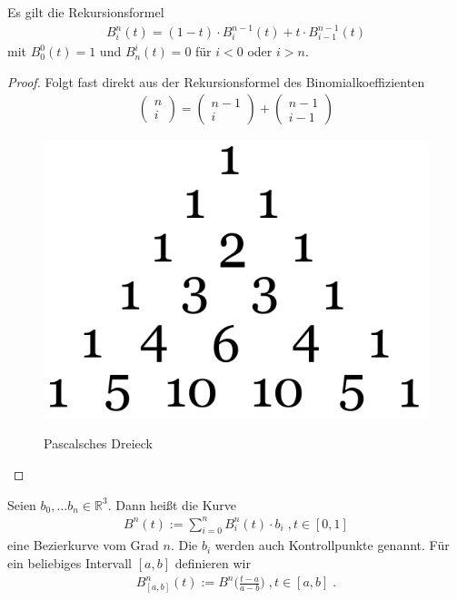 \begin{Satz}
Es gilt die Rekursionsformel
\begin{align*}
B_i^n(t) = (1-t) \cdot B^{n-1}_{i}(t) + t \cdot B^{n-1}_{i-1}(t)
\end{align*}
mit $B^0_0(t) = 1$ und $B^i_n(t) = 0$ für $i<0$ oder $i>n$.
\end{Satz}
\begin{proof}
Folgt fast direkt aus der Rekursionsformel des Binomialkoeffizienten
\begin{align*}
\begin{pmatrix} n \\ i \end{pmatrix} = \begin{pmatrix} n-1 \\ i \end{pmatrix} + \begin{pmatrix} n-1 \\ i-1 \end{pmatrix} 
\end{align*}
\begin{figure}[H]
    \centering
    \includegraphics[scale=0.2]{images/pascal.png}
    \label{fig:pascals-triangle}
    \caption{Pascalsches Dreieck}
\end{figure}
\end{proof}


\begin{Definition}
Seien $b_0, \hdots b_n \in \mathbb{R}^3$. Dann heißt die Kurve
\begin{align*}
B^n(t) := \sum_{i = 0}^{n} B_i^n(t) \cdot  b_i \; , t \in [0,1] 
\end{align*} 
eine Bezierkurve vom Grad $n$. Die $b_i$ werden auch Kontrollpunkte genannt.
Für ein beliebiges Intervall $[a,b]$ definieren wir
\begin{align*}
B^n_{[a,b]} (t):=  B^n\biggl( \frac{t-a }{a-b} \biggr) \; , t \in [a,b] \; .
\end{align*} 
\end{Definition}


